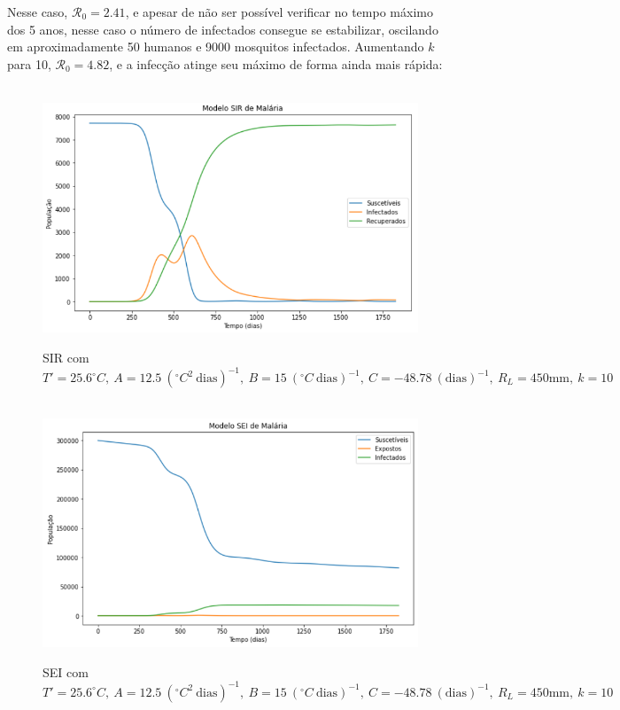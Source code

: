 \newpage
Nesse caso, $\mathcal{R}_0 = 2.41$, e apesar de não ser possível verificar no tempo 
máximo dos 5 anos, nesse caso o número de infectados consegue se estabilizar, 
oscilando em aproximadamente 50 humanos e 9000 mosquitos infectados. Aumentando $k$ para 10, 
$\mathcal{R}_0 = 4.82$, e a infecção atinge seu máximo de forma ainda mais rápida:
\begin{figure}[!ht]
        \centering
        \hbox{\hspace{4.2em} \includegraphics[scale=0.6] {Correcao_SIR_Desmat_k=10.png}}
        \caption{SIR com $T'=25.6 ^\circ C, \ A=12.5 \ (^\circ C^2 \ \text{dias})^{-1}, \ B=15 \ (^\circ C \ \text{dias})^{-1}, \ C=-48.78 \ (\text{dias})^{-1}, \ R_L=450 \text{mm}, \ k=10$}
\end{figure} 
\begin{figure}[!ht]
        \centering
        \hbox{\hspace{4.2em} \includegraphics[scale=0.6] {Correcao_SEI_Desmat_k=10.png}}
        \caption{SEI com $T'=25.6 ^\circ C, \ A=12.5 \ (^\circ C^2 \ \text{dias})^{-1}, \ B=15 \ (^\circ C \ \text{dias})^{-1}, \ C=-48.78 \ (\text{dias})^{-1}, \ R_L=450 \text{mm}, \ k=10$}
\end{figure} 
